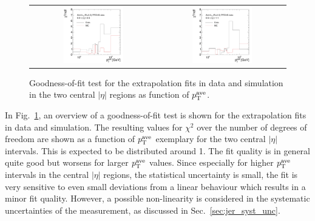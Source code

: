 \begin{figure}[!tp]
  \centering
  \begin{tabular}{cc}
                \includegraphics[width=0.49\textwidth]{figures/GoodnessOfFit_Eta0_final_nominal_v4.pdf} &
                \includegraphics[width=0.49\textwidth]{figures/GoodnessOfFit_Eta1_final_nominal_v4.pdf} \\
  \end{tabular}
  \caption{Goodness-of-fit test for the extrapolation fits in data and simulation in the two central $|\eta|$ regions as function of $p_{\text{T}}^\mathrm{ave}$.}
  \label{fig:goodness-of-fit}
\end{figure}
In Fig.~\ref{fig:goodness-of-fit}, an overview of a goodness-of-fit test is shown for the extrapolation fits in data and simulation. The resulting values for $\chi^2$ over the number of degrees of freedom are shown as a function of $p_{\text{T}}^\mathrm{ave}$ exemplary for the two central $|\eta|$ intervals. This is expected to be distributed around 1. The fit quality is in general quite good but worsens for larger $p_{\text{T}}^\mathrm{ave}$ values. Since especially for higher $p_{\text{T}}^\mathrm{ave}$ intervals in the central $|\eta|$ regions, the statistical uncertainty is small, the fit is very sensitive to even small deviations from a linear behaviour which results in a minor fit quality. However, a possible non-linearity is considered in the systematic uncertainties of the measurement, as discussed in Sec.~\ref{sec:jer_syst_unc}.

